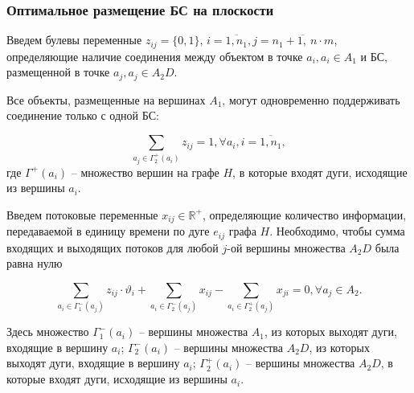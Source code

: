\begin{frame}
    \frametitle{Оптимальное размещение БС на плоскости}
    \fontsize{8pt}{7.2}\selectfont

    

    Введем булевы переменные $z_{ij} = \{0, 1\}$, $ i = \overline{1,n_1}, j = \overline{n_1+1, \ n \cdot m}$, определяющие наличие соединения между объектом в точке $a_i, a_i \in A_1$  и БС, размещенной в точке $a_j, a_j \in A_2D$.


    Все объекты, размещенные на вершинах $A_1$, могут одновременно поддерживать соединение только с одной БС:


    \begin{equation}\label{eq:part3_only_1_link_from_device}
        \sum_{a_j \in \Gamma_2^+(a_i)} z_{ij} = 1, \forall a_i, i =\overline{1, n_1},
    \end{equation} 
    где $\Gamma^+(a_i)$ -- множество вершин на графе $H$, в которые входят дуги, исходящие из вершины $a_i$.

    Введем потоковые переменные $x_{ij} \in \mathbb{R}^+$, определяющие количество информации, передаваемой в единицу времени по дуге $e_{ij}$ графа $H$. Необходимо, чтобы сумма входящих и выходящих потоков для любой $j$-ой вершины множества $A_2D$ была равна нулю  

    \begin{equation}\label{eq:part3_sta_io_flows} 
        \sum_{a_i \in \Gamma_1^-(a_j)} z_{ij} \cdot \vartheta_i + \sum_{a_i \in \Gamma_2^-(a_j)} x_{ij} -  \sum_{a_i \in \Gamma_2^+(a_j)} x_{ji} =0 ,\forall a_j \in A_2. 
    \end{equation} 

    Здесь множество $\Gamma_1^-(a_i)$ -- вершины множества $A_1$, из которых выходят дуги, входящие в вершину $a_i$; $\Gamma_2^-(a_i)$ -- вершины множества $A_2D$, из которых выходят дуги, входящие в  вершину $a_i$; $\Gamma_2^+(a_i)$ -- вершины множества $A_2D$, в которые входят дуги, исходящие из вершины  $a_i$.



\end{frame}


